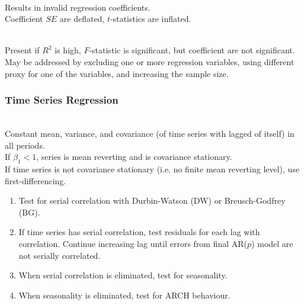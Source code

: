 \begin{method} \\
Results in invalid regression coefficients.\\
Coefficient $SE$ are deflated, $t$-statistics are inflated.
\end{method}

\begin{method} \\
Present if $R^2$ is high, $F$-statistic is significant, but coefficient are not significant.\\
May be addressed by excluding one or more regression variables, using different proxy for one of the variables, and increasing the sample size.
\end{method}

\subsubsection{Time Series Regression}

\begin{method} \\
Constant mean, variance, and covariance (of time series with lagged of itself) in all periods.\\
If $\beta_1 < 1$, series is mean reverting and is covariance stationary.\\
If time series is not covariance stationary (i.e. no finite mean reverting level), use first-differencing.
\end{method}

\begin{method} 
\begin{enumerate}[label=\roman*.]
\setlength{\itemsep}{0pt}
\item Test for serial correlation with Durbin-Watson (DW) or Breusch-Godfrey (BG).
\item If time series has serial correlation, test residuals for each lag with correlation. Continue increasing lag until errors from final AR($p$) model are not serially correlated.
\item When serial correlation is eliminated, test for seasonality.
\item When seasonality is eliminated, test for ARCH behaviour.
\end{enumerate}
\end{method}

